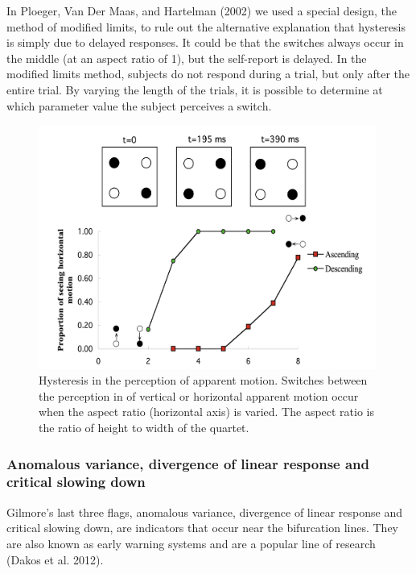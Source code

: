 \documentclass[
  letterpaper,
]{scrbook}
\begin{document}
In Ploeger, Van Der Maas, and Hartelman (2002) we used a special design,
the method of modified limits, to rule out the alternative explanation
that hysteresis is simply due to delayed responses. It could be that the
switches always occur in the middle (at an aspect ratio of 1), but the
self-report is delayed. In the modified limits method, subjects do not
respond during a trial, but only after the entire trial. By varying the
length of the trials, it is possible to determine at which parameter
value the subject perceives a switch.

\begin{figure}

{\centering \includegraphics[width=4.36844in,height=3.15089in]{media/ch3/image22.jpg}

}

\caption{\label{fig-ch3-img22-old-34}Hysteresis in the perception of
apparent motion. Switches between the perception in of vertical or
horizontal apparent motion occur when the aspect ratio (horizontal axis)
is varied. The aspect ratio is the ratio of height to width of the
quartet.}

\end{figure}

\hypertarget{anomalous-variance-divergence-of-linear-response-and-critical-slowing-down}{%
\subsubsection{Anomalous variance, divergence of linear response and
critical slowing
down}\label{anomalous-variance-divergence-of-linear-response-and-critical-slowing-down}}

Gilmore's last three flags, anomalous variance, divergence of linear
response and critical slowing down, are indicators that occur near the
bifurcation lines. They are also known as early warning systems and are
a popular line of research (Dakos et al. 2012).
\end{document}
